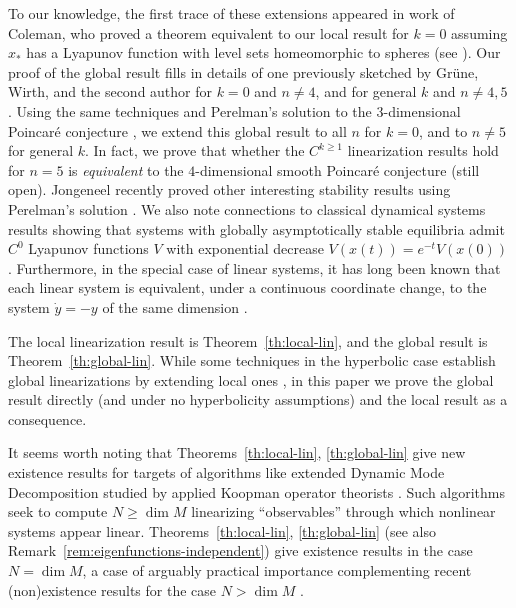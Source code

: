\documentclass[11pt]{amsart}
\theoremstyle{definition}
\begin{document}
To our knowledge, the first trace of these extensions appeared in work of Coleman, who proved a theorem equivalent to our local result for $k=0$ assuming $x_*$ has a Lyapunov function with level sets homeomorphic to spheres \cite{coleman1965local,coleman1966addendum} (see \cite[p.~247]{wilson1978reformulation}).
Our proof of the global result fills in details of one previously sketched by Gr\"une, Wirth, and the second author for $k=0$ and $n\neq 4$, and for general $k$ and $n\neq 4, 5$ \cite[remark in p.~133]{grune1999asymptotic}.
Using the same techniques and Perelman's solution to the $3$-dimensional Poincar\'{e} conjecture \cite{perelman2002entropy,perelman2003finite,perelman2003ricci}, we extend this global result to all $n$ for $k=0$, and to $n\neq 5$ for general $k$.
In fact, we prove that whether the $C^{k\geq 1}$ linearization results hold for $n=5$ is \emph{equivalent} to the $4$-dimensional smooth Poincar\'{e} conjecture (still open).
Jongeneel recently proved other interesting stability results using Perelman's solution \cite{jongeneel2024asymptotic}.
We also note connections to classical dynamical systems results showing that systems with globally asymptotically stable equilibria admit $C^0$ Lyapunov functions $V$ with exponential decrease $V(x(t)) = e^{-t}V(x(0))$ 
\cite[Chapter V.2]{BhatSzeg70}.
Furthermore, in the special case of linear systems, it has long been known that each linear system is equivalent, under a continuous coordinate change, to the system $\dot y = -y$ of the same dimension \cite{Arnold92}.

The local linearization result is Theorem~\ref{th:local-lin}, and the global result is Theorem~\ref{th:global-lin}.
While some techniques  in the hyperbolic case establish global linearizations by extending local ones \cite{lan2013linearization, eldering2018global,kvalheim2021existence}, in this paper we prove the global result directly (and under no hyperbolicity assumptions) and the local result as a consequence.
 
 It seems worth noting that Theorems~\ref{th:local-lin}, \ref{th:global-lin} give new existence results for targets of algorithms like extended Dynamic Mode Decomposition \cite{williams2015data} studied by applied Koopman operator theorists \cite{budisic2012appliedkoopmanism,mezic2020spectrum,brunton2022modern}.
 Such algorithms seek to compute $N\geq \dim M$ linearizing ``observables'' through which nonlinear systems appear linear.
 Theorems~\ref{th:local-lin}, \ref{th:global-lin} (see also Remark~\ref{rem:eigenfunctions-independent}) give existence results in the case $N=\dim M$, a case of arguably practical importance \cite{haller2024data} complementing recent (non)existence results for the case $N>\dim M$ \cite{liu2023non,kvalheim2024linearizability,arathoon2023koopman,liu2024properties}.
\end{document}
